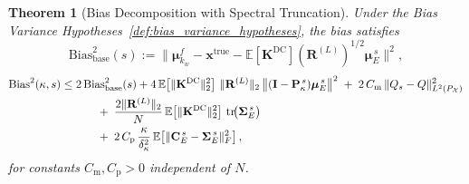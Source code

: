 \documentclass[11pt,a4paper]{article}
\newtheorem{theorem}{Theorem}
\begin{document}
\begin{theorem}[Bias Decomposition with Spectral Truncation]
\label{thm:bias_variance}
	Under the Bias Variance Hypotheses~\ref{def:bias_variance_hypotheses}, the bias satisfies
\begin{equation}
		\mathrm{Bias}_{\mathrm{base}}^{2}(s)
		:=
		\bigl\|\boldsymbol{\mu}_{k_w}^f-\mathbf{x}^{\mathrm{true}}-\mathbb{E}[\mathbf{K}^{\mathrm{DC}}](\mathbf{R}^{(L)})^{1/2}\boldsymbol{\mu}_E^{\,s}\bigr\|^2,
\end{equation}
	\begin{align}
	\mathrm{Bias}^2(\kappa,s)
	&\le
	2\,\mathrm{Bias}_{\mathrm{base}}^{2}(s)
	+
	4\,\mathbb{E}\!\left[\|\mathbf{K}^{\mathrm{DC}}\|_2^2\right]\,
	\|\mathbf{R}^{(L)}\|_2\,
	\bigl\|(\mathbf{I}-\mathbf{P}_\kappa^{\,s})\boldsymbol{\mu}_E^{\,s}\bigr\|^2
	\;+\;
	2\,C_{\mathrm{m}}\,
	\|Q_s-Q\|_{L^2(P_{\mathcal{X}})}^2
	\nonumber\\
		&\hspace{3.2em}
		+\;
		\frac{2\|\mathbf{R}^{(L)}\|_2}{N}\,
		\mathbb{E}\!\left[\|\mathbf{K}^{\mathrm{DC}}\|_2^2\right]\,
		\mathrm{tr}\!\bigl(\boldsymbol{\Sigma}_E^{\,s}\bigr)
		\nonumber\\
		&\hspace{3.2em}
		+\;
		2\,C_{\mathrm{p}}\,
		\frac{\kappa}{\delta_\kappa^2}\,
		\mathbb{E}\!\left[\|\mathbf{C}_E^{\,s}-\boldsymbol{\Sigma}_E^{\,s}\|_F^2\right],
		\label{eq:bias_bound_fixed_main}
		\end{align}
for constants $C_{\mathrm{m}},C_{\mathrm{p}}>0$ independent of $N$.
\end{theorem}
\end{document}
